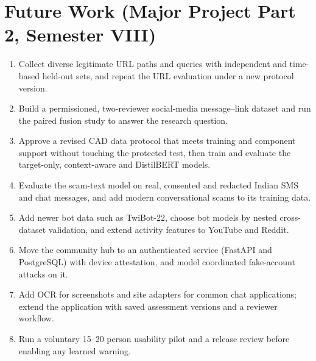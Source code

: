 \section{Future Work (Major Project Part 2, Semester VIII)}
\begin{enumerate}
\item Collect diverse legitimate URL paths and queries with independent and time-based held-out sets, and repeat the URL evaluation under a new protocol version.
\item Build a permissioned, two-reviewer social-media message--link dataset and run the paired fusion study to answer the research question.
\item Approve a revised CAD data protocol that meets training and component support without touching the protected test, then train and evaluate the target-only, context-aware and DistilBERT models.
\item Evaluate the scam-text model on real, consented and redacted Indian SMS and chat messages, and add modern conversational scams to its training data.
\item Add newer bot data such as TwiBot-22, choose bot models by nested cross-dataset validation, and extend activity features to YouTube and Reddit.
\item Move the community hub to an authenticated service (FastAPI and PostgreSQL) with device attestation, and model coordinated fake-account attacks on it.
\item Add OCR for screenshots and site adapters for common chat applications; extend the application with saved assessment versions and a reviewer workflow.
\item Run a voluntary 15--20 person usability pilot and a release review before enabling any learned warning.
\end{enumerate}
